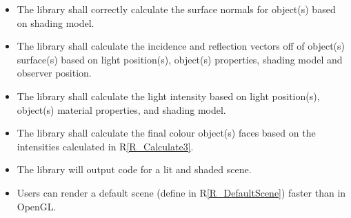 \documentclass[12pt]{article}
\newcounter{reqnum} %
\newcommand{\rref}[1]{R\ref{#1}}
\begin{document}
\begin{itemize}
	\item[R\refstepcounter{reqnum}\thereqnum \label{R_Calculate1}:] The library 
	shall correctly calculate the surface normals for object(s) based on 
	shading model.
	 
	\item[R\refstepcounter{reqnum}\thereqnum \label{R_Calculate2}:] The library 
	shall calculate the incidence and reflection vectors off of object(s) 
	surface(s) based on light position(s), object(s) properties, shading model 
	and observer position.
	
	\item[R\refstepcounter{reqnum}\thereqnum \label{R_Calculate3}:] The library 
	shall calculate the light intensity based on light position(s), object(s) 
	material properties, and shading model.
	
	\item[R\refstepcounter{reqnum}\thereqnum \label{R_Calculate4}:] The library 
	shall calculate the final colour object(s) faces based on the intensities 
	calculated in \rref{R_Calculate3}.
	
	\item[R\refstepcounter{reqnum}\thereqnum \label{R_Output}:] The library 
	will output code for a lit and shaded scene.
	
	\item[R\refstepcounter{reqnum}\thereqnum \label{R_Performance}:]Users can 
	render a default scene (define in \rref{R_DefaultScene}) faster than in 
	OpenGL.
\end{itemize}

\end{document}
